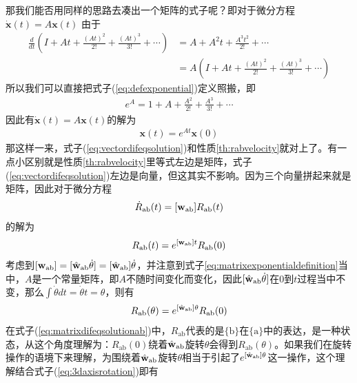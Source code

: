 \documentclass[12pt, a4paper, article, UTF8]{ctexart}
\begin{document}
那我们能否用同样的思路去凑出一个矩阵的式子呢？即对于微分方程$\dot{\mathbf{x}}(t) = A\mathbf{x}(t)$
由于
\begin{align}
\frac{d}{dt} (I + At +\frac{(At)^2}{2!} + \frac{(At)^3}{3!} + \cdots) &= A + A^2t + 
\frac{A^3t^2}{2!} + \cdots \nonumber \\
&= A(I + At +\frac{(At)^2}{2!} + \frac{(At)^3}{3!} + \cdots)
\end{align}
所以我们可以直接把式子(\ref{eq:defexponential})定义照搬，即
\begin{align}
e^{A} = 1 + A + \frac{A^2}{2!}  + \frac{A^3}{3!} + \cdots \label{eq:matrixexponentialdefinition}
\end{align}
因此有$\dot{\mathbf{x}}(t) = A\mathbf{x}(t)$的解为
\begin{align}
\mathbf{x}(t) = e^{At}\mathbf{x}(0) \label{eq:vectordifeqsolution}
\end{align}
那这样一来，式子(\ref{eq:vectordifeqsolution})和性质\ref{th:rabvelocity}就对上了。有一点小区别就是性质\ref{th:rabvelocity}里等式左边是矩阵，式子(\ref{eq:vectordifeqsolution})左边是向量，但这其实不影响。因为三个向量拼起来就是矩阵，因此对于微分方程
\begin{align}
\dot{R}_\textnormal{ab}(t) = [\mathbf{w}_\textnormal{ab}]R_\textnormal{ab}(t) \label{eq:matrixdifeq}
\end{align}
的解为
\begin{align}
R_\textnormal{ab}(t) = e^{[\mathbf{w}_\textnormal{ab}]t}R_\textnormal{ab}(0) \label{eq:matrixdifeqsolution}
\end{align}
考虑到$[\mathbf{w}_\textnormal{ab}]=[\hat{\mathbf{w}}_\textnormal{ab}\dot{\theta}] =[\hat{\mathbf{w}}_\textnormal{ab}]\dot{\theta}$，并注意到式子\ref{eq:matrixexponentialdefinition}当中，$A$是一个常量矩阵，即$A$不随时间变化而变化，因此$[\hat{\mathbf{w}}_\textnormal{ab}\dot{\theta}]$在0到$t$过程当中不变，那么$\int \dot{\theta}dt = \dot{\theta}t = \theta$，则有
\begin{align}
R_\textnormal{ab}(\theta) = e^{[\hat{\mathbf{w}}_\textnormal{ab}]\theta}R_\textnormal{ab}(0) \label{eq:matrixdifeqsolutionab}
\end{align}
在式子(\ref{eq:matrixdifeqsolutionab})中，$R_\text{ab}$代表的是$\{\text{b}\}$在$\{\text{a}\}$中的表达，是一种状态，从这个角度理解为：$R_\text{ab}(0)$绕着$\hat{\mathbf{w}}_\textnormal{ab}$旋转$\theta$会得到$R_\text{ab}(\theta)$。如果我们在旋转操作的语境下来理解，为围绕着$\hat{\mathbf{w}}_\textnormal{ab}$旋转$\theta$相当于引起了$e^{[\hat{\mathbf{w}}_\textnormal{ab}]\theta}$这一操作，这个理解结合式子(\ref{eq:3daxisrotation})即有
\end{document}
